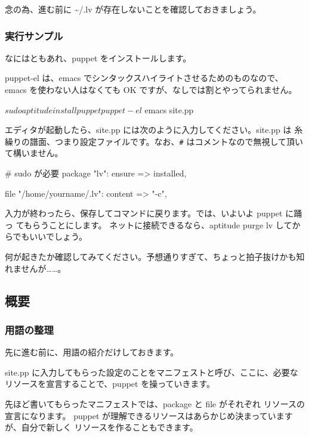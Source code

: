 \documentclass[mingoth,a4paper]{jsarticle}
\begin{document}
念の為、進む前に \textasciitilde /.lv が存在しないことを確認しておきましょう。

\subsubsection{実行サンプル}

なにはともあれ、puppet をインストールします。

puppet-el は、emacs でシンタックスハイライトさせるためのものなので、
emacs を使わない人はなくても OK ですが、なしでは割とやってられません。

\begin{commandline}
$ sudo aptitude install puppet puppet-el
$ emacs site.pp 
\end{commandline}

エディタが起動したら、site.pp には次のように入力してください。site.pp は
糸繰りの譜面、つまり設定ファイルです。なお、{\tt \#} はコメントなので無視して頂いて構いません。

\begin{commandline}
  # sudo が必要
  package { "lv":
    ensure => installed,
  }

  file { "/home/yourname/.lv":
    content => "-c",
  }
\end{commandline}

入力が終わったら、保存してコマンドに戻ります。では、いよいよ puppet に踊っ
てもらうことにします。
ネットに接続できるなら、aptitude purge lv してからでもいいでしょう。


何が起きたか確認してみてください。予想通りすぎて、ちょっと拍子抜けかも知
れませんが……。

\newpage
\subsection{概要}

\subsubsection{用語の整理}

先に進む前に、用語の紹介だけしておきます。

site.pp に入力してもらった設定のことをマニフェストと呼び、ここに、必要な
リソースを宣言することで、puppet を操っていきます。

先ほど書いてもらったマニフェストでは、package と file がそれぞれ
リソースの宣言になります。
puppet が理解できるリソースはあらかじめ決まっていますが、自分で新しく
リソースを作ることもできます。
\end{document}
